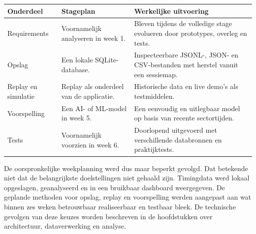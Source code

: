 \begin{table}[H]
\centering
\small
\begin{tabularx}{\textwidth}{@{}p{2cm}XX@{}}
\toprule
\textbf{Onderdeel} & \textbf{Stageplan} & \textbf{Werkelijke uitvoering} \\
\midrule
Requirements &
Voornamelijk analyseren in week 1. &
Bleven tijdens de volledige stage evolueren door prototypes, overleg en tests. \\

\addlinespace
Opslag &
Een lokale SQLite-database. &
Inspecteerbare JSONL-, JSON- en CSV-bestanden met herstel vanuit een sessiemap. \\

\addlinespace
Replay en simulatie &
Replay als onderdeel van de applicatie. &
Historische data en live demo's als testmiddelen. \\

\addlinespace
Voorspelling &
Een AI- of ML-model in week 5. &
Een eenvoudig en uitlegbaar model op basis van recente sectortijden. \\

\addlinespace
Tests &
Voornamelijk voorzien in week 6. &
Doorlopend uitgevoerd met verschillende databronnen en praktijktests. \\
\bottomrule
\end{tabularx}
\label{tab:stageplan-uitvoering}
\end{table}

De oorspronkelijke weekplanning werd dus maar beperkt gevolgd. Dat betekende niet dat de
belangrijkste doelstellingen niet gehaald zijn. Timingdata werd lokaal opgeslagen, geanalyseerd en in
een bruikbaar dashboard weergegeven. De geplande methoden voor opslag, replay en voorspelling
werden aangepast aan wat binnen zes weken betrouwbaar realiseerbaar en testbaar bleek.
De technische gevolgen van deze keuzes worden beschreven in de hoofdstukken over architectuur,
dataverwerking en analyse. 
